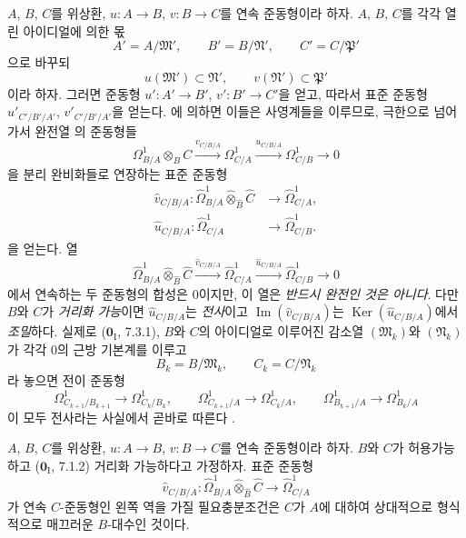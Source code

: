 \begin{env}[20.7.17]
\label{0.20.7.17-ko}
$A$, $B$, $C$를 위상환, $u:A\to B$, $v:B\to C$를 연속
준동형이라 하자. $A$, $B$, $C$를 각각 열린 아이디얼에 의한 몫
\[
  A'=A/\mathfrak M',\qquad
  B'=B/\mathfrak N',\qquad
  C'=C/\mathfrak P'
\]
으로 바꾸되
\[
  u(\mathfrak M')\subset\mathfrak N',\qquad
  v(\mathfrak N')\subset\mathfrak P'
\]
이라 하자. 그러면 준동형 $u':A'\to B'$, $v':B'\to C'$을 얻고,
따라서 표준 준동형 $u'_{C'/B'/A'}$, $v'_{C'/B'/A'}$을 얻는다.
에 의하면 이들은 사영계들을 이루므로, 극한으로
넘어가서 완전열 의 준동형들
\[
  \Omega^1_{B/A}\otimes_B C
  \xrightarrow{v_{C/B/A}}\Omega^1_{C/A}
  \xrightarrow{u_{C/B/A}}\Omega^1_{C/B}\longrightarrow0
\]
을 분리 완비화들로 연장하는 표준 준동형
\begin{align}
  \widehat v_{C/B/A}:
  \widehat{\Omega}^1_{B/A}
  \widehat\otimes_{\widehat B}\widehat C
  &\longrightarrow\widehat{\Omega}^1_{C/A},
  \tag{20.7.17.1}\label{0.20.7.17.1-ko}\\
  \widehat u_{C/B/A}:
  \widehat{\Omega}^1_{C/A}
  &\longrightarrow\widehat{\Omega}^1_{C/B}.
  \tag{20.7.17.2}\label{0.20.7.17.2-ko}
\end{align}
을 얻는다. 열
\begin{equation}
\tag{20.7.17.3}
\label{0.20.7.17.3-ko}
  \widehat{\Omega}^1_{B/A}
  \widehat\otimes_{\widehat B}\widehat C
  \xrightarrow{\widehat v_{C/B/A}}
  \widehat{\Omega}^1_{C/A}
  \xrightarrow{\widehat u_{C/B/A}}
  \widehat{\Omega}^1_{C/B}\longrightarrow0
\end{equation}
에서 연속하는 두 준동형의 합성은 $0$이지만, 이 열은
\emph{반드시 완전인 것은 아니다}. 다만 $B$와 $C$가
\emph{거리화 가능}이면 $\widehat u_{C/B/A}$는 \emph{전사}이고
$\operatorname{Im}(\widehat v_{C/B/A})$는
$\operatorname{Ker}(\widehat u_{C/B/A})$에서 \emph{조밀}하다.
실제로 ($\mathbf{0}_{\mathrm I}$, 7.3.1), $B$와 $C$의 아이디얼로
이루어진 감소열 $(\mathfrak M_k)$와 $(\mathfrak N_k)$가 각각
$0$의 근방 기본계를 이루고
\[
  B_k=B/\mathfrak M_k,\qquad C_k=C/\mathfrak N_k
\]
라 놓으면 전이 준동형
\[
  \Omega^1_{C_{k+1}/B_{k+1}}\longrightarrow\Omega^1_{C_k/B_k},
  \qquad
  \Omega^1_{C_{k+1}/A}\longrightarrow\Omega^1_{C_k/A},
  \qquad
  \Omega^1_{B_{k+1}/A}\longrightarrow\Omega^1_{B_k/A}
\]
이 모두 전사라는 사실에서 곧바로 따른다 .
\end{env}

\begin{proposition}[20.7.18]
\label{0.20.7.18-ko}
$A$, $B$, $C$를 위상환, $u:A\to B$, $v:B\to C$를 연속
준동형이라 하자. $B$와 $C$가 허용가능하고
($\mathbf{0}_{\mathrm I}$, 7.1.2) 거리화 가능하다고 가정하자.
표준 준동형
\[
  \widehat v_{C/B/A}:
  \widehat{\Omega}^1_{B/A}
  \widehat\otimes_{\widehat B}\widehat C
  \longrightarrow\widehat{\Omega}^1_{C/A}
\]
가 연속 $C$-준동형인 왼쪽 역을 가질 필요충분조건은 $C$가 $A$에
대하여 상대적으로 형식적으로 매끄러운 $B$-대수인 것이다.
\end{proposition}


